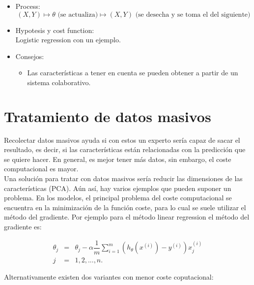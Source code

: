 \documentclass[12pt,a4paper]{article}
\begin{document}
\begin{itemize}
\item Process:
\begin{equation*}
(X,Y) \longmapsto \theta \mbox{ (se actualiza)} \longmapsto (X,Y) \mbox{ (se desecha y se toma el del siguiente)} 
\end{equation*}
\item Hypotesis y cost function:
\\
Logistic regression con un ejemplo.
\item Consejos:
\begin{itemize}
\item Las características a tener en cuenta se pueden obtener a partir de un sistema colaborativo.
\end{itemize}
\end{itemize}

\newpage

\section{Tratamiento de datos masivos}
Recolectar datos masivos ayuda si con estos un experto sería capaz de sacar el resultado, es decir, si las características están relacionadas con la predicción que se quiere hacer. En general, es mejor tener más datos, sin embargo, el coste computacional es mayor. 
\\

Una solución para tratar con datos masivos sería reducir las dimensiones de las características (PCA). Aún así, hay varios ejemplos que pueden suponer un problema. En los modelos, el principal problema del coste computacional se encuentra en la minimización de la función coste, para lo cual se suele utilizar el método del gradiente. Por ejemplo para el método linear regression el método del gradiente es: 

\begin{eqnarray*}
\theta_j &=& \theta_j - \alpha \dfrac{1}{m} \sum_{i=1}^{m} (h_{\theta}(x^{(i)})-y^{(i)})x_j^{(i)}   \\
j &=& 1,2,...,n.
\end{eqnarray*}

Alternativamente existen dos variantes con menor coste coputacional:
\end{document}
